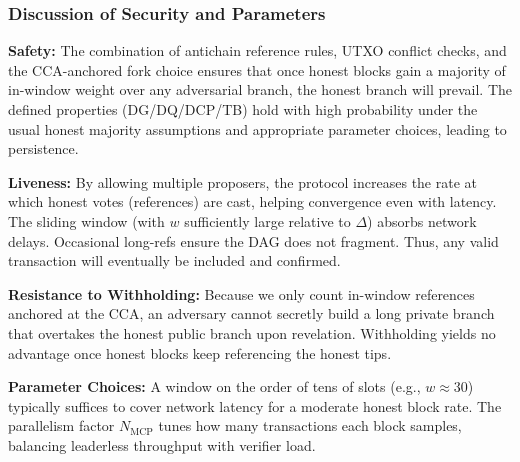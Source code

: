 \documentclass[11pt]{article}
\newcommand{\MCP}{\ensuremath{\mathrm{MCP}}\xspace}
\begin{document}
\subsubsection{Discussion of Security and Parameters}
\noindent
\textbf{Safety:} The combination of antichain reference rules, UTXO conflict checks, and the CCA-anchored fork choice ensures that once honest blocks gain a majority of in-window weight over any adversarial branch, the honest branch will prevail. The defined properties (DG/DQ/DCP/TB) hold with high probability under the usual honest majority assumptions and appropriate parameter choices, leading to persistence.

\smallskip

\noindent
\textbf{Liveness:} By allowing multiple proposers, the protocol increases the rate at which honest votes (references) are cast, helping convergence even with latency. The sliding window (with $w$ sufficiently large relative to $\Delta$) absorbs network delays. Occasional long-refs ensure the DAG does not fragment. Thus, any valid transaction will eventually be included and confirmed.

\smallskip

\noindent
\textbf{Resistance to Withholding:} Because we only count in-window references anchored at the CCA, an adversary cannot secretly build a long private branch that overtakes the honest public branch upon revelation. Withholding yields no advantage once honest blocks keep referencing the honest tips.

\smallskip

\noindent
\textbf{Parameter Choices:} A window on the order of tens of slots (e.g., $w\approx 30$) typically suffices to cover network latency for a moderate honest block rate. The parallelism factor $N_{\MCP}$ tunes how many transactions each block samples, balancing leaderless throughput with verifier load.
\end{document}
